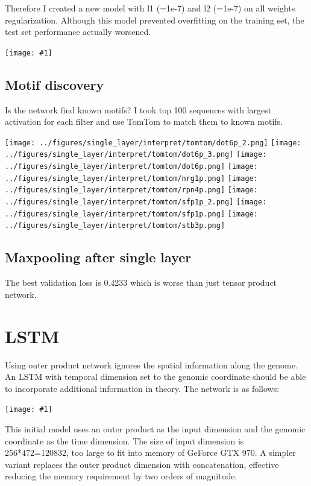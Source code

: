 \documentclass{article}
\newcommand{\includegraph}[1]{\texttt{[image: \#1]}}
\begin{document}
Therefore I created a new model with l1 (=1e-7) and l2 (=1e-7) on all weights regularization. Although this model prevented overfitting on the training set, the test set performance actually worsened. 

\includegraph{../figures/single_layer/20170605_092542_l1_1e-07_l2_1e-07/loss_vs_epoch.png}



\subsection{Motif discovery}
Is the network find known motifs? I took top 100 sequences with largest activation for each filter and use TomTom to match them to known motifs.

\texttt{[image: ../figures/single\_layer/interpret/tomtom/dot6p\_2.png]}
\texttt{[image: ../figures/single\_layer/interpret/tomtom/dot6p\_3.png]}
\texttt{[image: ../figures/single\_layer/interpret/tomtom/dot6p.png]}
\texttt{[image: ../figures/single\_layer/interpret/tomtom/nrg1p.png]}
\texttt{[image: ../figures/single\_layer/interpret/tomtom/rpn4p.png]}
\texttt{[image: ../figures/single\_layer/interpret/tomtom/sfp1p\_2.png]}
\texttt{[image: ../figures/single\_layer/interpret/tomtom/sfp1p.png]}
\texttt{[image: ../figures/single\_layer/interpret/tomtom/stb3p.png]}


\subsection{Maxpooling after single layer}
The best validation loss is 0.4233 which is worse than just tensor product network. 


\section{LSTM}
Using outer product network ignores the spatial information along the genome. An LSTM with temporal dimension set to the genomic coordinate should be able to incorporate additional information in theory. The network is as follows: 

\includegraph{../figures/lstm/model/model.eps}

This initial model uses an outer product as the input dimension and the genomic coordinate as the time dimension. The size of input dimension is 256*472=120832, too large to fit into memory of GeForce GTX 970. A simpler variant replaces the outer product dimension with concatenation, effective reducing the memory requirement by two orders of magnitude. 
\end{document}
